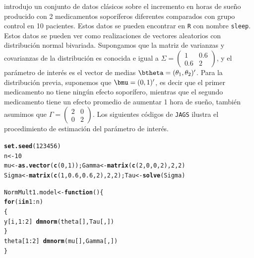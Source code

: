 \documentclass[10pt,openright]{book}\usepackage[]{graphicx}\usepackage[]{color}
\makeatletter
\newcommand{\hlnum}[1]{\textcolor[rgb]{0.686,0.059,0.569}{#1}}%
\newcommand{\hlopt}[1]{\textcolor[rgb]{0,0,0}{#1}}%
\newcommand{\hlstd}[1]{\textcolor[rgb]{0.345,0.345,0.345}{#1}}%
\newcommand{\hlkwa}[1]{\textcolor[rgb]{0.161,0.373,0.58}{\textbf{#1}}}%
\newcommand{\hlkwb}[1]{\textcolor[rgb]{0.69,0.353,0.396}{#1}}%
\newcommand{\hlkwd}[1]{\textcolor[rgb]{0.737,0.353,0.396}{\textbf{#1}}}%
\newenvironment{kframe}{%
 \def\at@end@of@kframe{}%
 \ifinner\ifhmode%
  \def\at@end@of@kframe{\end{minipage}}%
  \begin{minipage}{\columnwidth}%
 \fi\fi%
 \def\FrameCommand##1{\hskip\@totalleftmargin \hskip-\fboxsep
 \colorbox{shadecolor}{##1}\hskip-\fboxsep
     \hskip-\linewidth \hskip-\@totalleftmargin \hskip\columnwidth}%
 \MakeFramed {\advance\hsize-\width
   \@totalleftmargin\z@ \linewidth\hsize
   \@setminipage}}%
 {\par\unskip\endMakeFramed%
 \at@end@of@kframe}
\newenvironment{knitrout}{}{} %
\makeatother
\begin{document}
\begin{Eje}\label{Eje_Student}
 introdujo un conjunto de datos cl\'asicos sobre el incremento en horas de sue\~no producido con 2 medicamentos sopor\'iferos diferentes comparados con grupo control en 10 pacientes. Estos datos se pueden encontrar en \verb'R' con nombre \verb'sleep'. Estos datos se pueden ver como realizaciones de vectores aleatorios con distribuci\'on normal bivariada. Supongamos que la matriz de varianzas y covarianzas de la distribuci\'on es conocida e igual a $\Sigma=\begin{pmatrix}1&0.6\\ 0.6&2\end{pmatrix}$, y el par\'ametro de inter\'es es el vector de medias $\btheta=(\theta_1,\theta_2)'$. Para la distribuci\'on previa, suponemos que $\bmu=(0,1)'$, es decir que el primer medicamento no tiene ning\'un efecto sopor\'ifero, mientras que el segundo medicamento tiene un efecto promedio de aumentar 1 hora de sue\~no, tambi\'en asumimos que $\Gamma=\begin{pmatrix}2&0\\ 0&2\end{pmatrix}$. Los siguientes c\'odigos de \verb'JAGS' ilustra el procedimiento de estimaci\'on del par\'ametro de inter\'es.

\begin{knitrout}
\color{fgcolor}\begin{kframe}
\begin{alltt}
\hlkwd{set.seed}\hlstd{(}\hlnum{123456}\hlstd{)}
\hlstd{n} \hlkwb{<-} \hlnum{10}
\hlstd{mu}\hlkwb{<-} \hlkwd{as.vector}\hlstd{(}\hlkwd{c}\hlstd{(}\hlnum{0}\hlstd{,}\hlnum{1}\hlstd{)); Gamma} \hlkwb{<-} \hlkwd{matrix}\hlstd{(}\hlkwd{c}\hlstd{(}\hlnum{2}\hlstd{,}\hlnum{0}\hlstd{,}\hlnum{0}\hlstd{,}\hlnum{2}\hlstd{),}\hlnum{2}\hlstd{,}\hlnum{2}\hlstd{)}
\hlstd{Sigma}  \hlkwb{<-} \hlkwd{matrix}\hlstd{(}\hlkwd{c}\hlstd{(}\hlnum{1}\hlstd{,}\hlnum{0.6}\hlstd{,}\hlnum{0.6}\hlstd{,}\hlnum{2}\hlstd{),}\hlnum{2}\hlstd{,}\hlnum{2}\hlstd{); Tau} \hlkwb{<-} \hlkwd{solve}\hlstd{(Sigma)}

\hlstd{NormMult1.model} \hlkwb{<-} \hlkwa{function}\hlstd{()\{}
  \hlkwa{for}\hlstd{(i} \hlkwa{in} \hlnum{1} \hlopt{:} \hlstd{n)}
  \hlstd{\{}
    \hlstd{y[i,} \hlnum{1}\hlopt{:}\hlnum{2}\hlstd{]} \hlopt{~} \hlkwd{dmnorm}\hlstd{(theta[], Tau[,])}
  \hlstd{\}}
  \hlstd{theta[}\hlnum{1}\hlopt{:}\hlnum{2}\hlstd{]} \hlopt{~} \hlkwd{dmnorm}\hlstd{(mu[], Gamma[,])}
\hlstd{\}}


\end{alltt}
\end{kframe}
\end{knitrout}
\end{Eje}
\end{document}
